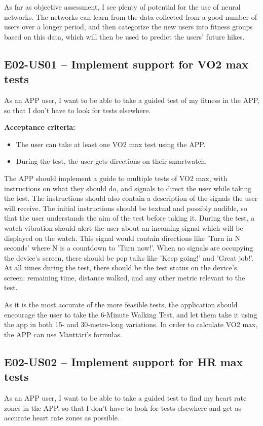 As far as objective assessment, I see plenty of potential for the use of neural networks.
The networks can learn from the data collected from a good number of users over a longer period, and then categorize the new users into fitness groups based on this data, which will then be used to predict the users' future hikes.

\subsection*{E02-US01 -- Implement support for VO2 max tests}
As an APP user, I want to be able to take a guided test of my fitness in the APP, so that I don't have to look for tests elsewhere.

\textbf{Acceptance criteria:}
\begin{itemize}
    \item The user can take at least one VO2 max test using the APP.
    \item During the test, the user gets directions on their smartwatch.
\end{itemize}

The APP should implement a guide to multiple tests of VO2 max, with instructions on what they should do, and signals to direct the user while taking the test.
The instructions should also contain a description of the signals the user will receive.
The initial instructions should be textual and possibly audible, so that the user understands the aim of the test before taking it.
During the test, a watch vibration should alert the user about an incoming signal which will be displayed on the watch.
This signal would contain directions like 'Turn in N seconds' where N is a countdown to 'Turn now!'.
When no signals are occupying the device's screen, there should be pep talks like 'Keep going!' and 'Great job!'.
At all times during the test, there should be the test status on the device's screen: remaining time, distance walked, and any other metric relevant to the test.

As it is the most accurate of the more feasible tests, the application should encourage the user to take the 6-Minute Walking Test, and let them take it using the app in both 15- and 30-metre-long variations.
In order to calculate VO2 max, the APP can use Mänttäri's formulas.

\subsection*{E02-US02 -- Implement support for HR max tests}
As an APP user, I want to be able to take a guided test to find my heart rate zones in the APP, so that I don't have to look for tests elsewhere and get as accurate heart rate zones as possible.

